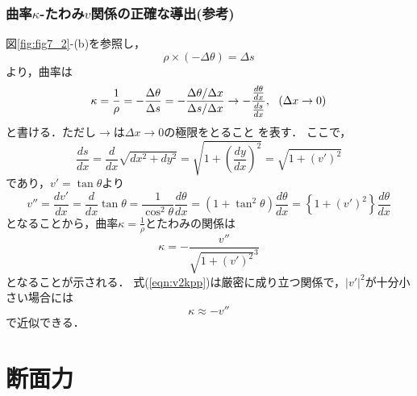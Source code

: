 \documentclass[10pt,a4j]{jbook}
\begin{document}
\subsubsection*{曲率$\kappa$-たわみ$v$関係の正確な導出(参考)}
図\ref{fig:fig7_2}-(b)を参照し，
\begin{equation}
	\rho  \times \left( { - \Delta \theta } \right) = \Delta s
\end{equation}
より，曲率は
\begin{equation}
	\kappa  = \frac{1}{\rho } =  - \frac{{\Delta \theta }}{{\Delta s}} =  - \frac{{{{\Delta \theta } \mathord{\left/
 {\vphantom {{\Delta \theta } {\Delta x}}} \right.
 \kern-\nulldelimiterspace} {\Delta x}}}}{{{{\Delta s} \mathord{\left/
 {\vphantom {{\Delta s} {\Delta x}}} \right.
 \kern-\nulldelimiterspace} {\Delta x}}}} \to  - \frac{{\frac{{d\theta }}{{dx}}}}{{\frac{{ds}}{{dx}}}}
	, \ \ \left(\Delta x \rightarrow 0\right)
\end{equation}
と書ける．ただし$\rightarrow$は$\Delta x \rightarrow 0$の極限をとること
を表す．
ここで，
\begin{equation}
	\frac{{ds}}{{dx}} = \frac{d}{{dx}}\sqrt {d{x^2} + d{y^2}}  = \sqrt {1 + {{\left( {\frac{{dy}}{{dx}}} \right)}^2}}  = \sqrt {1 + {{\left( {v'} \right)}^2}} 
\end{equation}
であり，$v'=\tan \theta$より
\begin{equation}
	v''=
	\frac{{dv'}}{{dx}} = \frac{d}{{dx}}\tan \theta  = \frac{1}{{{{\cos }^2}\theta }}\frac{{d\theta }}{{dx}} = \left( {1 + {{\tan }^2}\theta } \right)\frac{{d\theta }}{{dx}} = \left\{ {1 + {{\left( {v'} \right)}^2}} \right\}\frac{{d\theta }}{{dx}}
\end{equation}
となることから，曲率$\kappa=\frac{1}{\rho}$とたわみの関係は
\begin{equation}
	\kappa =  - \frac{{v''}}{{{{\sqrt {1 + {{\left( {v'} \right)}^2}} }^3}}} 
	\label{eqn:v2kpp}
\end{equation}
となることが示される．
式(\ref{eqn:v2kpp})は厳密に成り立つ関係で，$\left|v'\right|^2$が十分小さい場合には
\begin{equation}
	\kappa \approx  - v''
\end{equation}
で近似できる．
\section{断面力}
\end{document}
